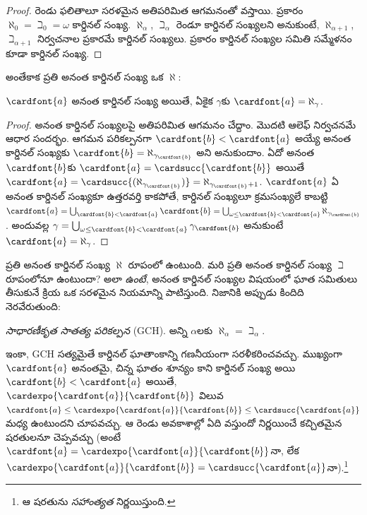 \documentclass[../../../include/open-logic-section]{subfiles}
\begin{document}
\begin{proof}
రెండు ఫలితాలూ సరళమైన అతిపరిమిత ఆగమనంతో వస్తాయి.  ప్రకారం $\aleph_0 =
\beth_0 = \omega$ కార్డినల్ సంఖ్య. $\aleph_\alpha$, $\beth_\alpha$ రెండూ కార్డినల్ సంఖ్యలని అనుకుంటే, $\aleph_{\alpha+1}$, $\beth_{\alpha+1}$ నిర్వచనాల ప్రకారమే కార్డినల్ సంఖ్యలు.  ప్రకారం కార్డినల్ సంఖ్యల సమితి సమ్మేళనం కూడా కార్డినల్ సంఖ్య.
\end{proof}
\noindent
అంతేకాక ప్రతి అనంత కార్డినల్ సంఖ్య ఒక $\aleph$:

\begin{prop}
$\cardfont{a}$ అనంత కార్డినల్ సంఖ్య అయితే, ఏకైక $\gamma$కు $\cardfont{a} =
\aleph_\gamma$.
\end{prop}

\begin{proof}
అనంత కార్డినల్ సంఖ్యలపై అతిపరిమిత ఆగమనం చేద్దాం. మొదటి ఆలెఫ్ నిర్వచనమే ఆధార సందర్భం. ఆగమన పరికల్పనగా $\cardfont{b} < \cardfont{a}$ అయ్యే అనంత కార్డినల్ సంఖ్యకు $\cardfont{b} =
\aleph_{\gamma_\cardfont{b}}$ అని అనుకుందాం. ఏదో అనంత $\cardfont{b}$కు $\cardfont{a} =
\cardsucc{\cardfont{b}}$ అయితే $\cardfont{a} =
\cardsucc{(\aleph_{\gamma_\cardfont{b}})}=
\aleph_{\gamma_\cardfont{b}+1}$. $\cardfont{a}$ ఏ అనంత కార్డినల్ సంఖ్యకూ ఉత్తరవర్తి కాకపోతే, కార్డినల్ సంఖ్యలూ క్రమసంఖ్యలే కాబట్టి $\cardfont{a} = \bigcup_{\cardfont{b} < \cardfont{a}} \cardfont{b} =
\bigcup_{\omega\leq\cardfont{b} < \cardfont{a}}{\aleph_{\gamma_\cardfont{b}}}$. అందువల్ల $\gamma =
\bigcup_{\omega\leq\cardfont{b} < \cardfont{a}}\gamma_\cardfont{b}$ అనుకుంటే $\cardfont{a} = \aleph_\gamma$.
\end{proof}

ప్రతి అనంత కార్డినల్ సంఖ్య $\aleph$ రూపంలో ఉంటుంది.
మరి ప్రతి అనంత కార్డినల్ సంఖ్య $\beth$ రూపంలోనూ
ఉంటుందా? అలా \emph{ఉంటే}, అనంత కార్డినల్ సంఖ్యల
విషయంలో ఘాత సమితులు తీసుకునే క్రియ ఒక సరళమైన నియమాన్ని
పాటిస్తుంది. నిజానికి అప్పుడు కిందిది నెరవేరుతుంది:

\begin{defish}
\emph{సాధారణీకృత సాతత్య పరికల్పన} (GCH). అన్ని $\alpha$లకు $\aleph_\alpha  = \beth_\alpha$.
\end{defish}

ఇంకా, GCH సత్యమైతే కార్డినల్ ఘాతాంకాన్ని గణనీయంగా సరళీకరించవచ్చు. ముఖ్యంగా $\cardfont{a}$ అనంతమై, చిన్న ఘాతం శూన్యం కాని కార్డినల్ సంఖ్య అయి $\cardfont{b} < \cardfont{a}$ అయితే, $\cardexpo{\cardfont{a}}{\cardfont{b}}$ విలువ $\cardfont{a}\leq \cardexpo{\cardfont{a}}{\cardfont{b}} \leq
\cardsucc{\cardfont{a}}$ మధ్య ఉంటుందని చూపవచ్చు. ఆ రెండు అవకాశాల్లో ఏది వస్తుందో నిర్ణయించే కచ్చితమైన షరతులనూ చెప్పవచ్చు (అంటే $\cardfont{a} = \cardexpo{\cardfont{a}}{\cardfont{b}}$నా, లేక $\cardexpo{\cardfont{a}}{\cardfont{b}} =
\cardsucc{\cardfont{a}}$నా).\footnote{ఆ షరతును \emph{సహాంత్యత} నిర్ణయిస్తుంది.}
\end{document}

